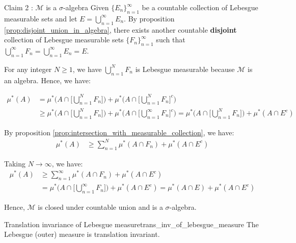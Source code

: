 \begin{proof*}
    \begin{subproof}{\newline Claim 2 : $\mathcal{M}$ is a $\sigma$-algebra}
        Given $\{E_n\}_{n=1}^\infty$ be a countable collection of Lebesgue measurable sets and let $E=\bigcup_{n=1}^\infty E_n$. By proposition \ref{prop:disjoint_union_in_algebra}, there exists another countable \textbf{disjoint} collection of Lebesgue measurable sets $\{F_n\}_{n=1}^\infty$ such that $\bigcup_{n=1}^\infty F_n = \bigcup_{n=1}^\infty E_n=E$. 
        
        \noindent \newline For any integer $N\ge1$, we have $\bigcup_{n=1}^N F_n$ is Lebesgue measurable because $\mathcal{M}$ is an algebra. Hence, we have:
    
        \begin{align*}
            \mu^*(A) &= \mu^*\Bigg( A \cap \Bigg[ \bigcup_{n=1}^N F_n \Bigg] \Bigg) + \mu^*\Bigg( A \cap \Bigg[ \bigcup_{n=1}^N F_n \Bigg]^c \Bigg) \\
            &\ge \mu^*\Bigg( A \cap \Bigg[ \bigcup_{n=1}^N F_n \Bigg] \Bigg) + \mu^*\Bigg( A \cap \Bigg[ \bigcup_{n=1}^\infty F_n \Bigg]^c \Bigg) = \mu^*\Bigg( A \cap \Bigg[ \bigcup_{n=1}^N F_n \Bigg] \Bigg) + \mu^*(A\cap E^c)
        \end{align*}

        \noindent\newline By proposition \ref{prop:intersection_with_measurable_collection}, we have:
        \begin{align*}
            \mu^*(A) &\ge \sum_{n=1}^N \mu^*(A\cap F_n) + \mu^*(A\cap E^c)
        \end{align*}

        \noindent\newline Taking $N\to\infty$, we have:
        \begin{align*}
            \mu^*(A) &\ge \sum_{n=1}^\infty \mu^*(A\cap F_n) + \mu^*(A\cap E^c) \\
            &= \mu^*\Bigg( A \cap \Bigg[ \bigcup_{n=1}^\infty F_n \Bigg]\Bigg) + \mu^*(A\cap E^c) = \mu^*(A\cap E) + \mu^*(A\cap E^c)
        \end{align*}

        \noindent\newline Hence, $\mathcal{M}$ is closed under countable union and is a $\sigma$-algebra.
    \end{subproof}
\end{proof*}

\begin{proposition}{Translation invariance of Lebesgue measure}{trans_inv_of_lebesgue_measure}
    The Lebesgue (outer) measure is translation invariant.
\end{proposition}

